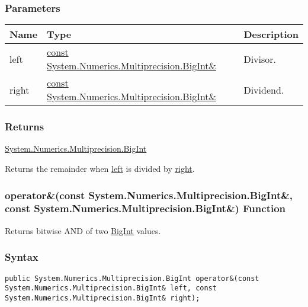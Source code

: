 \documentclass[a4paper,oneside,11.000000pt]{book}
\begin{document}
\subsubsection*{Parameters}
\begin{flushleft}
\begin{supertabular}[l]{!{\raggedright}p{1.30721cm}!{\raggedright}p{8.55945cm}!{\raggedright}p{2.65538cm}}
\textbf{Name}
& \textbf{Type}
& \textbf{Description}
\\
\hline
left
& \hyperlink{System.Numerics.Multiprecision.BigInt}{const System.\-Numerics.\-Multiprecision.\-BigInt\&\-}
& Divisor.

\\
right
& \hyperlink{System.Numerics.Multiprecision.BigInt}{const System.\-Numerics.\-Multiprecision.\-BigInt\&\-}
& Dividend.

\\
\end{supertabular}

\end{flushleft}
\subsubsection*{Returns}
\hyperlink{System.Numerics.Multiprecision.BigInt}{System.\-Numerics.\-Multiprecision.\-BigInt}
\begin{flushleft}
Returns the remainder when \hyperlink{System.Numerics.Multiprecision.operator.remainder.C.R.System.Numerics.Multiprecision.BigInt.C.R.System.Numerics.Multiprecision.BigInt.left}{left} is divided by 
\hyperlink{System.Numerics.Multiprecision.operator.remainder.C.R.System.Numerics.Multiprecision.BigInt.C.R.System.Numerics.Multiprecision.BigInt.right}{right}.

\end{flushleft}
\clearpage

\hypertarget{System.Numerics.Multiprecision.operator.and.C.R.System.Numerics.Multiprecision.BigInt.C.R.System.Numerics.Multiprecision.BigInt}{\subsubsection*{operator\&(const System.Numerics.Multiprecision.BigInt\&, const System.Numerics.Multiprecision.BigInt\&) Function}}
\begin{flushleft}
Returns bitwise AND of two \hyperlink{System.Numerics.Multiprecision.BigInt}{BigInt} values.

\end{flushleft}
\subsubsection*{Syntax}
\texttt{public System.Numerics.Multiprecision.BigInt operator\&(const System.Numerics.Multiprecision.BigInt\& left, const System.Numerics.Multiprecision.BigInt\& right);}
\end{document}

